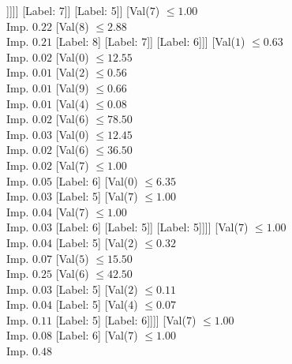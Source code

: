 \documentclass[margin=10pt]{standalone}
\begin{document}
\begin{forest}
									[Label: 6]
									[Val($1$) $ \leq 0.18$ \\ Imp. $0.07$
										[Label: 6]
										[Val($7$) $ \leq 1.00$ \\ Imp. $0.21$
											[Label: 6]
											[Label: 5]]]]]
							[Label: 7]]
						[Label: 5]]
					[Val($7$) $ \leq 1.00$ \\ Imp. $0.22$
						[Val($8$) $ \leq 2.88$ \\ Imp. $0.21$
							[Label: 8]
							[Label: 7]]
						[Label: 6]]]
				[Val($1$) $ \leq 0.63$ \\ Imp. $0.02$
					[Val($0$) $ \leq 12.55$ \\ Imp. $0.01$
						[Val($2$) $ \leq 0.56$ \\ Imp. $0.01$
							[Val($9$) $ \leq 0.66$ \\ Imp. $0.01$
								[Val($4$) $ \leq 0.08$ \\ Imp. $0.02$
									[Val($6$) $ \leq 78.50$ \\ Imp. $0.03$
										[Val($0$) $ \leq 12.45$ \\ Imp. $0.02$
											[Val($6$) $ \leq 36.50$ \\ Imp. $0.02$
												[Val($7$) $ \leq 1.00$ \\ Imp. $0.05$
													[Label: 6]
													[Val($0$) $ \leq 6.35$ \\ Imp. $0.03$
														[Label: 5]
														[Val($7$) $ \leq 1.00$ \\ Imp. $0.04$
															[Val($7$) $ \leq 1.00$ \\ Imp. $0.03$
																[Label: 6]
																[Label: 5]]
															[Label: 5]]]]
												[Val($7$) $ \leq 1.00$ \\ Imp. $0.04$
													[Label: 5]
													[Val($2$) $ \leq 0.32$ \\ Imp. $0.07$
														[Val($5$) $ \leq 15.50$ \\ Imp. $0.25$
															[Val($6$) $ \leq 42.50$ \\ Imp. $0.03$
																[Label: 5]
																[Val($2$) $ \leq 0.11$ \\ Imp. $0.04$
																	[Label: 5]
																	[Val($4$) $ \leq 0.07$ \\ Imp. $0.11$
																		[Label: 5]
																		[Label: 6]]]]
															[Val($7$) $ \leq 1.00$ \\ Imp. $0.08$
																[Label: 6]
																[Val($7$) $ \leq 1.00$ \\ Imp. $0.48$

\end{forest}
\end{document}
